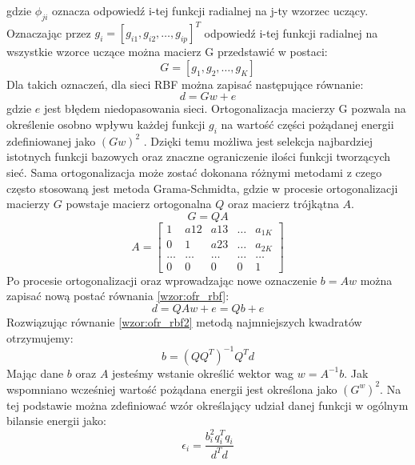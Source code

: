 gdzie $\phi_{ji}$ oznacza odpowiedź i-tej funkcji radialnej na j-ty wzorzec uczący. Oznaczając przez $g_i = [g_{i1}, g_{i2}, \hdots, g_{ip}]^T$ odpowiedź i-tej funkcji radialnej na wszystkie wzorce uczące można macierz G przedstawić w postaci:
\begin{equation}G = [g_1, g_2, \hdots, g_K] \end{equation}
Dla takich oznaczeń, dla sieci RBF można zapisać następujące równanie:
\begin{equation}
\label{wzor:ofr_rbf}
d = Gw + e\end
{equation}
gdzie $e$ jest błędem niedopasowania sieci. Ortogonalizacja macierzy G pozwala na określenie osobno wpływu każdej funkcji $g_i$ na wartość części pożądanej energii zdefiniowanej jako $(Gw)^2$ \cite{Osowski}. Dzięki temu możliwa jest selekcja najbardziej istotnych funkcji bazowych oraz znaczne ograniczenie ilości funkcji tworzących sieć. Sama ortogonalizacja może zostać dokonana różnymi metodami z czego często stosowaną jest metoda Grama-Schmidta, gdzie w procesie ortogonalizacji macierzy $G$ powstaje macierz ortogonalna $Q$ oraz macierz trójkątna $A$.
\begin{equation}G = QA\end{equation}
\begin{equation}
A = \begin{bmatrix}
1      & a{12}  & a{13}  & \hdots & a_{1K} \\
0      & 1      & a{23}  & \hdots & a_{2K} \\
\hdots & \hdots & \hdots & \hdots & \hdots \\
0      & 0      & 0      & 0      & 1     
\end{bmatrix}
\end{equation}
Po procesie ortogonalizacji oraz wprowadzając nowe oznaczenie $b = Aw$ można zapisać nową postać równania \ref{wzor:ofr_rbf}:
\begin{equation}
	\label{wzor:ofr_rbf2}
	d = QAw + e = Qb + e
\end{equation}
Rozwiązując równanie \ref{wzor:ofr_rbf2} metodą najmniejszych kwadratów otrzymujemy:
\begin{equation}
	b = (QQ^T)^{-1}Q^Td
\end{equation}
Mając dane $b$ oraz $A$ jesteśmy wstanie określić wektor wag $w = A^{-1}b$.
Jak wspomniano wcześniej wartość pożądana energii jest określona jako $(G^w)^2$. Na tej podstawie można zdefiniować wzór określający udział danej funkcji w ogólnym bilansie energii jako:
\begin{equation}
	\epsilon_i = \frac{b_i^2q_i^Tq_i}{d^Td}
\end{equation}

